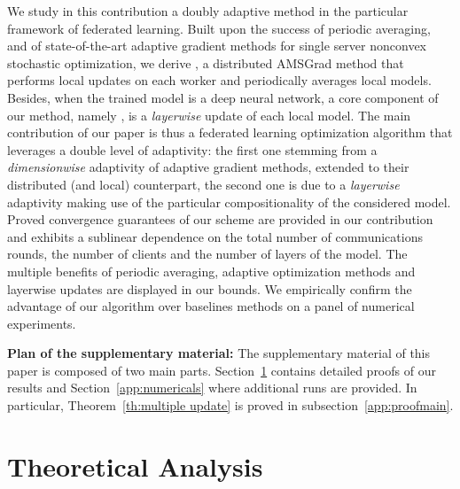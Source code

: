 \documentclass[twoside]{article}
\begin{document}
We study in this contribution a doubly adaptive method in the particular framework of federated learning.
Built upon the success of periodic averaging, and of state-of-the-art adaptive gradient methods for single server nonconvex stochastic optimization, we derive \algo, a distributed AMSGrad method that performs local updates on each worker and periodically averages local models. 
Besides, when the trained model is a deep neural network, a core component of our method, namely \algo, is a \emph{layerwise} update of each local model.
The main contribution of our paper is thus a federated learning optimization algorithm that leverages a double level of adaptivity: the first one stemming from a \emph{dimensionwise} adaptivity of adaptive gradient methods, extended to their distributed (and local) counterpart, the second one is due to a  \emph{layerwise} adaptivity making use of the particular compositionality of the considered model.
Proved convergence guarantees of our scheme are provided in our contribution and exhibits a sublinear dependence on the total number of communications rounds, the number of clients and the number of layers of the model.
The multiple benefits of periodic averaging, adaptive optimization methods and layerwise updates are displayed in our bounds.
We empirically confirm the advantage of our algorithm over baselines methods on a panel of numerical experiments.
\clearpage







\clearpage

\appendix 


\onecolumn

  \hsize\textwidth
  \linewidth{}
 
 \vspace{0.5in}
 
 
\textbf{Plan of the supplementary material:}
The supplementary material of this paper is composed of two main parts.
Section~\ref{app:proofs} contains detailed proofs of our results and Section~\ref{app:numericals} where additional runs are provided.
In particular, Theorem~\ref{th:multiple update} is proved in subsection~\ref{app:proofmain}.



\section{Theoretical Analysis}\label{app:proofs}
\end{document}
